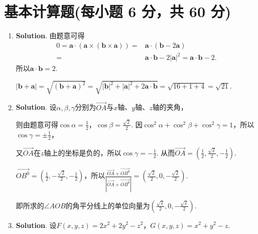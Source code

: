 \documentclass[../main.tex]{subfiles}
\begin{document}
\section{基本计算题(每小题 6 分，共 60 分)}
\begin{enumerate}
    \item \textbf{Solution}. 由题意可得
          \[
              \begin{aligned}
                  0 = \boldsymbol{a}\cdot \left(\boldsymbol{a}\times (\boldsymbol{b}\times\boldsymbol{a})\right) = {} & \boldsymbol{a}\cdot (\boldsymbol{b}-2\boldsymbol{a})                                         \\
                  = {}                                                                                                & \boldsymbol{a}\cdot\boldsymbol{b}-2|\boldsymbol{a}|^{2}=\boldsymbol{a}\cdot\boldsymbol{b}-2.
              \end{aligned}
          \]
          所以$\boldsymbol{a}\cdot\boldsymbol{b}=2$.

          $|\boldsymbol{b}+\boldsymbol{a}| = \sqrt{(\boldsymbol{b}+\boldsymbol{a})^{2}}
              = \sqrt{|\boldsymbol{b}|^{2}+|\boldsymbol{a}|^{2}+2\boldsymbol{a}\cdot\boldsymbol{b}}
              = \sqrt{16+1+4}= \sqrt{21}$.

    \item \textbf{Solution}. 设$\alpha,\beta,\gamma$分别为$\overrightarrow{OA}$与$x$轴、$y$轴、$z$轴的夹角，

          则由题意可得$\cos \alpha = \frac{1}{2}$，$\cos \beta = \frac{\sqrt{2}}{2}$.
          因$\cos^{2} \alpha + \cos^{2} \beta + \cos^{2} \gamma = 1$，所以$\cos \gamma
              = \pm \frac{1}{2}$，

          又$\overrightarrow{OA}$在$z$轴上的坐标是负的，所以$\cos \gamma = -\frac{1}{2}$.
          从而$\overrightarrow{OA}= \left(\frac{1}{2},\frac{\sqrt{2}}{2},-\frac{1}{2}
              \right)$.

          $\overrightarrow{OB^0}=\left(\frac{1}{2},-\frac{\sqrt{2}}{2},-\frac{1}{2}\right
              )$，所以$\frac{\overrightarrow{OA}+\overrightarrow{OB^0}}{|\overrightarrow{OA}+\overrightarrow{OB^0}|}
              = \left(\frac{\sqrt{2}}{2},0,-\frac{\sqrt{2}}{2}\right)$.

          即所求的$\angle AOB$的角平分线上的单位向量为$\left(\frac{\sqrt{2}}{2},0,-\frac{\sqrt{2}}{2}
              \right)$.

    \item \textbf{Solution}. 设$F(x,y,z) = 2x^{2}+2y^{2}-z^{2}$，$G(x,y,z)=x^{2}+
              y^{2}-z$.


\end{enumerate}
\end{document}

